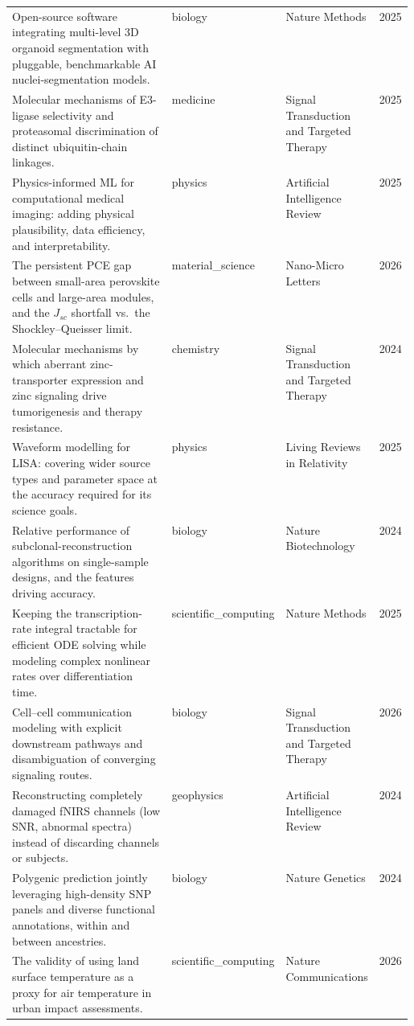 \begin{landscape}
\begin{longtable}{@{}p{0.58\linewidth} l l c@{}}
\addlinespace
Open-source software integrating multi-level 3D organoid segmentation with pluggable, benchmarkable AI nuclei-segmentation models. & biology & Nature Methods & 2025 \\
\addlinespace
Molecular mechanisms of E3-ligase selectivity and proteasomal discrimination of distinct ubiquitin-chain linkages. & medicine & Signal Transduction and Targeted Therapy & 2025 \\
\addlinespace
Physics-informed ML for computational medical imaging: adding physical plausibility, data efficiency, and interpretability. & physics & Artificial Intelligence Review & 2025 \\
\addlinespace
The persistent PCE gap between small-area perovskite cells and large-area modules, and the $J_{sc}$ shortfall vs.\ the Shockley--Queisser limit. & material\_science & Nano-Micro Letters & 2026 \\
\addlinespace
Molecular mechanisms by which aberrant zinc-transporter expression and zinc signaling drive tumorigenesis and therapy resistance. & chemistry & Signal Transduction and Targeted Therapy & 2024 \\
\addlinespace
Waveform modelling for LISA: covering wider source types and parameter space at the accuracy required for its science goals. & physics & Living Reviews in Relativity & 2025 \\
\addlinespace
Relative performance of subclonal-reconstruction algorithms on single-sample designs, and the features driving accuracy. & biology & Nature Biotechnology & 2024 \\
\addlinespace
Keeping the transcription-rate integral tractable for efficient ODE solving while modeling complex nonlinear rates over differentiation time. & scientific\_computing & Nature Methods & 2025 \\
\addlinespace
Cell--cell communication modeling with explicit downstream pathways and disambiguation of converging signaling routes. & biology & Signal Transduction and Targeted Therapy & 2026 \\
\addlinespace
Reconstructing completely damaged fNIRS channels (low SNR, abnormal spectra) instead of discarding channels or subjects. & geophysics & Artificial Intelligence Review & 2024 \\
\addlinespace
Polygenic prediction jointly leveraging high-density SNP panels and diverse functional annotations, within and between ancestries. & biology & Nature Genetics & 2024 \\
\addlinespace
The validity of using land surface temperature as a proxy for air temperature in urban impact assessments. & scientific\_computing & Nature Communications & 2026 \\

\end{longtable}
\end{landscape}

